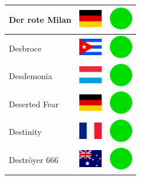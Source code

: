 \documentclass[12pt, a4paper, twoside]{report}
\begin{document}
\begin{center}
\begin{longtable}{|p{5cm}|p{2cm}|p{2cm}|}
Der rote Milan & \includegraphics[width=1cm]{4x3/de} & \includegraphics[width=1cm]{likes/y} \\ \hline
Desbroce & \includegraphics[width=1cm]{4x3/cu} & \includegraphics[width=1cm]{likes/y} \\ \hline
Desdemonia & \includegraphics[width=1cm]{4x3/lu} & \includegraphics[width=1cm]{likes/y} \\ \hline
Deserted Fear & \includegraphics[width=1cm]{4x3/de} & \includegraphics[width=1cm]{likes/y} \\ \hline
Destinity & \includegraphics[width=1cm]{4x3/fr} & \includegraphics[width=1cm]{likes/y} \\ \hline
Deströyer 666 & \includegraphics[width=1cm]{4x3/au} & \includegraphics[width=1cm]{likes/y} \\ \hline

\end{longtable}
\end{center}
\end{document}
